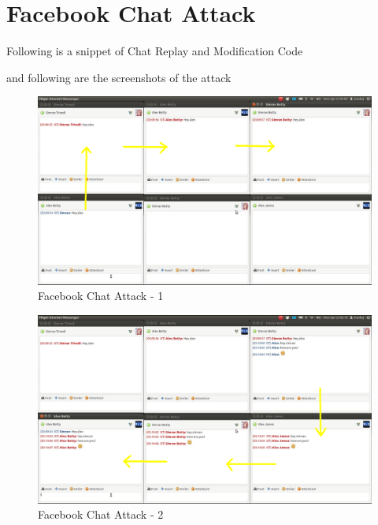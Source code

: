 \section{Facebook Chat Attack}

Following is a snippet of Chat Replay and Modification Code


and following are the screenshots of the attack

\begin{figure}[H]
\centering
\includegraphics[scale=0.6, angle=90]{project/diagrams/attack1}
\caption{Facebook Chat Attack - 1}
\label{fig:attack1}
\end{figure}

\begin{figure}[H]
\centering
\includegraphics[scale=0.6, angle=90]{project/diagrams/attack2}
\caption{Facebook Chat Attack - 2}
\label{fig:attack1}
\end{figure}

